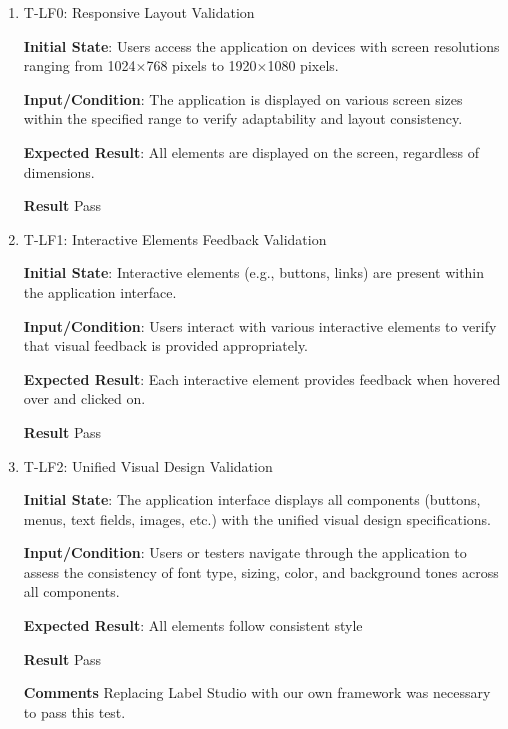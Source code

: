 \documentclass[12pt, titlepage]{article}
\begin{document}
\begin{enumerate}
    \item{T-LF0: Responsive Layout Validation\\}
        
    \textbf{Initial State}: Users access the application on devices with screen resolutions ranging from 1024$\times$768 pixels to 1920$\times$1080 pixels.
    
    \textbf{Input/Condition}: The application is displayed on various screen sizes within the specified range to verify adaptability and layout consistency.

    \textbf{Expected Result}: All elements are displayed on the screen, regardless of dimensions.

    \textbf{Result} Pass

    \item{T-LF1: Interactive Elements Feedback Validation\\}
    
    \textbf{Initial State}: Interactive elements (e.g., buttons, links) are present within the application interface.
    
    \textbf{Input/Condition}: Users interact with various interactive elements to verify that visual feedback is provided appropriately.
    
    \textbf{Expected Result}: Each interactive element provides feedback when hovered over and clicked on.

    \textbf{Result} Pass
    
    \item{T-LF2: Unified Visual Design Validation\\}
    
    
    \textbf{Initial State}: The application interface displays all components (buttons, menus, text fields, images, etc.) with the unified visual design specifications.
    
    \textbf{Input/Condition}: Users or testers navigate through the application to assess the consistency of font type, sizing, color, and background tones across all components.
    
    \textbf{Expected Result}: All elements follow consistent style

    \textbf{Result} Pass

    \textbf{Comments} Replacing Label Studio with our own framework was necessary to pass this test.
    
    \end{enumerate}
\end{document}
